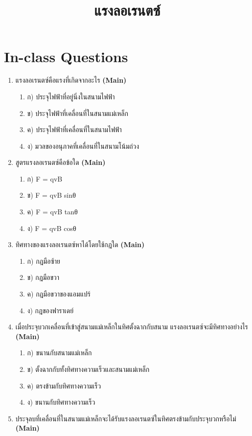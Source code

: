 \documentclass[12pt]{article}
\begin{document}
\title{แรงลอเรนตซ์}
\maketitle
\section*{In-class Questions}
\begin{enumerate}[label=\arabic*.]
\item แรงลอเรนตซ์คือแรงที่เกิดจากอะไร \hfill \textbf{\small (Main)}
\begin{enumerate}[label=)]
\item ก) ประจุไฟฟ้าที่อยู่นิ่งในสนามไฟฟ้า
\item ข) ประจุไฟฟ้าที่เคลื่อนที่ในสนามแม่เหล็ก
\item ค) ประจุไฟฟ้าที่เคลื่อนที่ในสนามไฟฟ้า
\item ง) มวลของอนุภาคที่เคลื่อนที่ในสนามโน้มถ่วง
\end{enumerate}
\item สูตรแรงลอเรนตซ์คือข้อใด \hfill \textbf{\small (Main)}
\begin{enumerate}[label=)]
\item ก) F = qvB
\item ข) F = qvB sinθ
\item ค) F = qvB tanθ
\item ง) F = qvB cosθ
\end{enumerate}
\item ทิศทางของแรงลอเรนตซ์หาได้โดยใช้กฎใด \hfill \textbf{\small (Main)}
\begin{enumerate}[label=)]
\item ก) กฎมือซ้าย
\item ข) กฎมือขวา
\item ค) กฎมือขวาของแอมแปร์
\item ง) กฎของฟาราเดย์
\end{enumerate}
\item เมื่อประจุบวกเคลื่อนที่เข้าสู่สนามแม่เหล็กในทิศตั้งฉากกับสนาม แรงลอเรนตซ์จะมีทิศทางอย่างไร \hfill \textbf{\small (Main)}
\begin{enumerate}[label=)]
\item ก) ขนานกับสนามแม่เหล็ก
\item ข) ตั้งฉากกับทั้งทิศทางความเร็วและสนามแม่เหล็ก
\item ค) ตรงข้ามกับทิศทางความเร็ว
\item ง) ขนานกับทิศทางความเร็ว
\end{enumerate}
\item ประจุลบที่เคลื่อนที่ในสนามแม่เหล็กจะได้รับแรงลอเรนตซ์ในทิศตรงข้ามกับประจุบวกหรือไม่ \hfill \textbf{\small (Main)}

\end{enumerate}
\end{document}
